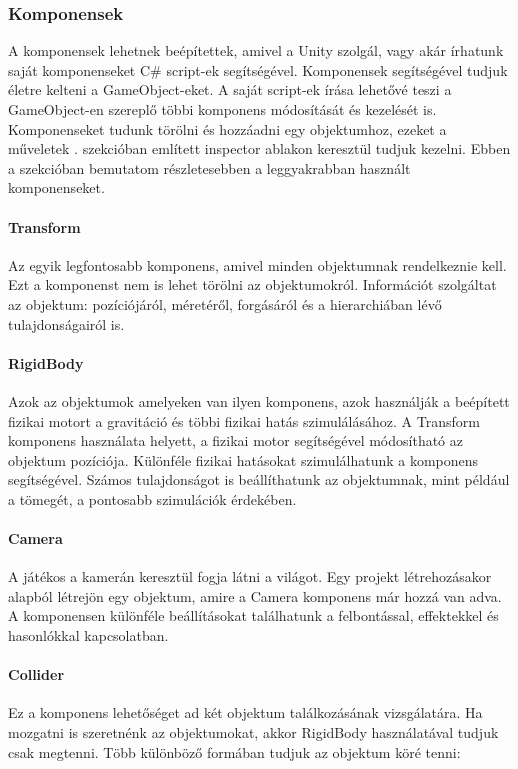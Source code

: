 \documentclass[]{thesis-ekf}
\theoremstyle{definition}
\theoremstyle{remark}
\begin{document}
\subsubsection{Komponensek}

A komponensek lehetnek beépítettek, amivel a Unity szolgál, vagy akár írhatunk saját komponenseket C\# script-ek segítségével. Komponensek segítségével tudjuk életre kelteni a GameObject-eket. A saját script-ek írása lehetővé teszi a GameObject-en szereplő többi komponens módosítását és kezelését is. Komponenseket tudunk törölni és hozzáadni egy objektumhoz, ezeket a műveletek . szekcióban említett inspector ablakon keresztül tudjuk kezelni. Ebben a szekcióban bemutatom részletesebben a leggyakrabban használt komponenseket. \cite{UnityComponents}

\paragraph{Transform}
Az egyik legfontosabb komponens, amivel minden objektumnak rendelkeznie kell. Ezt a komponenst nem is lehet törölni az objektumokról. Információt szolgáltat az objektum: pozíciójáról, méretéről, forgásáról és a hierarchiában lévő tulajdonságairól is. \cite{UnityTransform}
	
\paragraph{RigidBody}
Azok az objektumok amelyeken van ilyen komponens, azok használják a beépített fizikai motort a gravitáció és többi fizikai hatás szimulálásához. A Transform komponens használata helyett, a fizikai motor segítségével módosítható az objektum pozíciója. Különféle fizikai hatásokat szimulálhatunk a komponens segítségével. Számos tulajdonságot is beállíthatunk az objektumnak, mint például a tömegét, a pontosabb szimulációk érdekében. \cite{UnityRigidbody}

\paragraph{Camera}
A játékos a kamerán keresztül fogja látni a világot. Egy projekt létrehozásakor alapból létrejön egy objektum, amire a Camera komponens már hozzá van adva. A komponensen különféle beállításokat találhatunk a felbontással, effektekkel és hasonlókkal kapcsolatban. \cite{UnityCamera}

\paragraph{Collider}
Ez a komponens lehetőséget ad két objektum találkozásának vizsgálatára. Ha mozgatni is szeretnénk az objektumokat, akkor RigidBody használatával tudjuk csak megtenni. Több különböző formában tudjuk az objektum köré tenni: \cite{UnityCollider}
\end{document}
